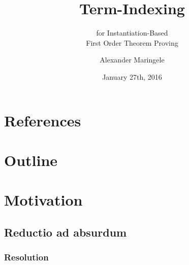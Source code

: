\documentclass[ 
xcolor={usenames,dvipsnames,svgnames,tablem} 
,handout
]{beamer}
\author{Alexander Maringele}
\title{Term-Indexing
}
\subtitle{for Instantiation-Based\\First Order Theorem Proving}
\date{January 27th, 2016}
\begin{document}


\frame[<+->]{
\maketitle
}

\section*{References}


\section*{Outline}
\setcounter{tocdepth}{1}




%

\section{Motivation}

%

\subsection{Reductio ad absurdum}
%
%

\begin{frame}
\frametitle{Resolution}

\end{frame}
\end{document}
